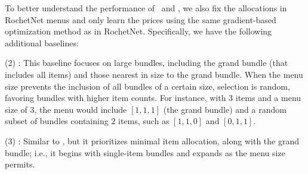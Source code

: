 To better understand the performance of \name~and \bundle, we also fix the allocations in RochetNet menus and only learn the prices using the same gradient-based optimization method as in RochetNet. Specifically, we have the following additional baselines:

(2) \textbf{\bigbundle}: This baseline focuses on large bundles, including the grand bundle (that includes all items) and those nearest in size to the grand bundle. When the menu size prevents the inclusion of all bundles of a certain size, selection is random, %
favoring bundles with higher item counts. For instance, with 3 items and a menu size of 3, the menu would include $[1,1,1]$ (the grand bundle) and a random subset of bundles containing $2$ items, such as $[1,1,0]$ and $[0,1,1]$.

(3) \textbf{\smallbundle}: Similar to \bigbundle, but it prioritizes minimal item allocation, along with the grand bundle; i.e., it begins with single-item bundles and expands as the menu size permits.

